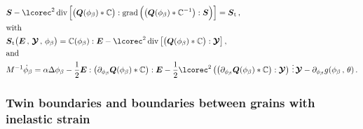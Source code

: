\documentclass[preprint,review,3p,times,authoryear]{elsarticle}
\begin{document}
\begin{subequations}
  \begin{align}
    & \tS -  \lcorec^{2}\diver{\left[ \bigl( \tQ(\phi_{\beta})*\bbC \bigr):\grad{\Bigl( \bigl( \tQ(\phi_{\beta})*\bbC^{-1} \bigr):\tS\Bigr)} \right]} = \tSt\,,\\
    &\text{with}\nonumber\\
    &\tSt\bigl( \tE\,,\, \ttY\,,\, \phi_{\beta} \bigr) = \bbC(\phi_{\beta}):\tE - \lcorec^{2}\diver{\left[ \bigl( \tQ(\phi_{\beta})*\bbC \bigr):\ttY \right]}\,,\\
&\text{and}\nonumber\\
    \label{eq:AC_equation_grain_cubic}
     &M^{-1}\sdot\phi_{\beta} = \alpha\Delta\phi_{\beta} - \half\tE:\bigl( \pder{\tQ(\phi_{\beta})}{\phi_{\beta}}*\bbC \bigr):\tE -  \half\lcorec^{2}\left( \bigl( \pder{\tQ(\phi_{\beta})}{\phi_{\beta}}*\bbC  \bigr):\ttY\right) \tridot \ttY - \pder{g(\phi_{\beta}\,,\,\theta)}{\phi_{\beta}}\,.
  \end{align}
\end{subequations}

\subsubsection{Twin boundaries and boundaries between grains with inelastic strain}
\label{sec:twin-boundaries}
\end{document}
